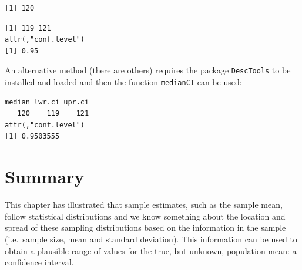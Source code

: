 \documentclass[
  oneside]{krantz}
\newenvironment{Shaded}{\begin{snugshade}}{\end{snugshade}}
\newcommand{\AttributeTok}[1]{\textcolor[rgb]{0.77,0.63,0.00}{#1}}
\newcommand{\CommentTok}[1]{\textcolor[rgb]{0.56,0.35,0.01}{\textit{#1}}}
\newcommand{\ConstantTok}[1]{\textcolor[rgb]{0.00,0.00,0.00}{#1}}
\newcommand{\FunctionTok}[1]{\textcolor[rgb]{0.00,0.00,0.00}{#1}}
\newcommand{\NormalTok}[1]{#1}
\newcommand{\SpecialCharTok}[1]{\textcolor[rgb]{0.00,0.00,0.00}{#1}}
\begin{document}
\begin{Shaded}
\end{Shaded}

\begin{verbatim}
[1] 120
\end{verbatim}

\begin{Shaded}
\end{Shaded}

\begin{verbatim}
[1] 119 121
attr(,"conf.level")
[1] 0.95
\end{verbatim}

An alternative method (there are others) requires the package \texttt{DescTools} to be installed and loaded and then the function \texttt{medianCI} can be used:

\begin{Shaded}
\end{Shaded}

\begin{verbatim}
median lwr.ci upr.ci 
   120    119    121 
attr(,"conf.level")
[1] 0.9503555
\end{verbatim}

\hypertarget{SUMci}{%
\section{Summary}\label{SUMci}}

This chapter has illustrated that sample estimates, such as the sample mean, follow statistical distributions and we know something about the location and spread of these sampling distributions based on the information in the sample (i.e.~sample size, mean and standard deviation). This information can be used to obtain a plausible range of values for the true, but unknown, population mean: a confidence interval.
\end{document}
